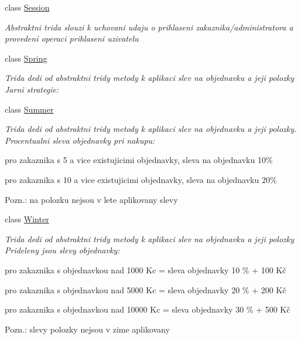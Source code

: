 \begin{DoxyCompactItemize}
class \mbox{\hyperlink{class_eshop_1_1_session}{Session}}
\begin{DoxyCompactList}\small\item\em Abstraktni trida slouzi k uchovani udaju o prihlaseni zakaznika/administratora a provedeni operaci prihlaseni uzivatelu \end{DoxyCompactList}\item 
class \mbox{\hyperlink{class_eshop_1_1_spring}{Spring}}
\begin{DoxyCompactList}\small\item\em Trida dedi od abstraktni tridy metody k aplikaci slev na objednavku a jeji polozky Jarni strategie\+: \end{DoxyCompactList}\item 
class \mbox{\hyperlink{class_eshop_1_1_summer}{Summer}}
\begin{DoxyCompactList}\small\item\em Trida dedi od abstraktni tridy metody k aplikaci slev na objednavku a jeji polozky. Procentualni sleva objednavky pri nakupu\+: 
\begin{DoxyItemize}
\item pro zakaznika s 5 a vice existujicimi objednavky, sleva na objednavku 10\%  
\item pro zakaznika s 10 a vice existujicimi objednavky, sleva na objednavku 20\%  
\end{DoxyItemize}Pozn.\+: na polozku nejsou v lete aplikovany slevy \end{DoxyCompactList}\item 
class \mbox{\hyperlink{class_eshop_1_1_winter}{Winter}}
\begin{DoxyCompactList}\small\item\em Trida dedi od abstraktni tridy metody k aplikaci slev na objednavku a jeji polozky Prideleny jsou slevy objednavky\+: 
\begin{DoxyItemize}
\item pro zakaznika s objednavkou nad 1000 Kc = sleva objednavky 10 \% + 100 Kč  
\item pro zakaznika s objednavkou nad 5000 Kc = sleva objednavky 20 \% + 200 Kč  
\item pro zakaznika s objednavkou nad 10000 Kc = sleva objednavky 30 \% + 500 Kč  
\end{DoxyItemize}Pozn.\+: slevy polozky nejsou v zime aplikovany \end{DoxyCompactList}\end{DoxyCompactItemize}
